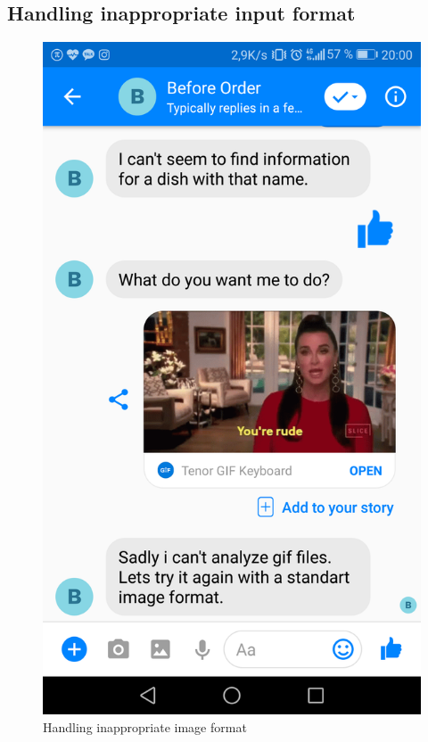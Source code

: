 \subsection{Handling inappropriate input format}

\begin{figure}[htbp]
\centerline{\includegraphics[height=\custompicheight]{./pictures/facebook_gif_image}}
\caption{Handling inappropriate image format}
\label{fig:Before Order_handling_error}
\end{figure}
\FloatBarrier

